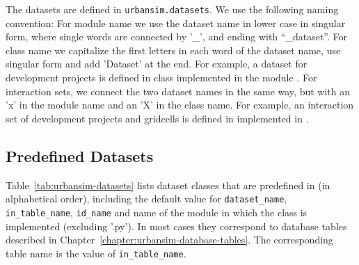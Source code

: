The  datasets \datasetindex are defined in \verb|urbansim.datasets|. \datasetindex
We use the following naming convention: For module name we use the dataset 
name in lower case in singular form, where single words are connected by
'_', and ending with ``_dataset''.
For class name we capitalize the first letters in each word of the dataset \datasetindex
name, use singular form and add 'Dataset' at the end. For example, a dataset \datasetindex for
development projects is defined in class 
implemented in the module . For interaction
sets, we connect the two dataset \datasetindex names in the same way, but with 
an 'x' in the module name and an 'X' in the class name. For example, an
interaction set of development projects and gridcells is defined in
 implemented in
.

\subsection{Predefined Datasets}
\datasetindex
%
Table~\ref{tab:urbansim-datasets} lists dataset \datasetindex classes that are predefined in
 (in alphabetical order), including the default value for
\verb|dataset_name|, \datasetindex \verb|in_table_name|, \verb|id_name| and name of the
module in which the class is implemented (excluding '.py'). In most cases they
correspond to database tables described in
Chapter~\ref{chapter:urbansim-database-tables}. The corresponding table name
is the value of \verb|in_table_name|.

